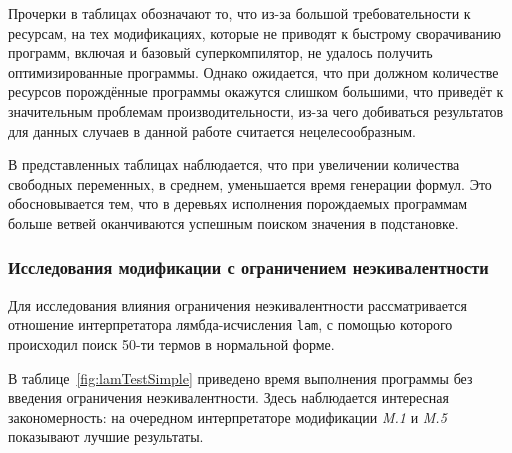 Прочерки в таблицах обозначают то, что из-за большой требовательности к ресурсам,
на тех модификациях, которые не приводят к быстрому сворачиванию программ,
включая и базовый суперкомпилятор, не удалось получить оптимизированные программы.
Однако ожидается,
что при должном количестве ресурсов порождённые программы окажутся слишком большими,
что приведёт к значительным проблемам производительности, из-за чего добиваться
результатов
для данных случаев в данной работе считается нецелесообразным.

В представленных таблицах наблюдается, что при увеличении количества свободных переменных,
в среднем, уменьшается время генерации формул. Это обосновывается тем, что в
деревьях исполнения порождаемых программам больше ветвей оканчиваются успешным
поиском значения в подстановке.



\subsubsection{Исследования модификации с ограничением неэкивалентности}

Для исследования влияния ограничения неэкивалентности рассматривается отношение
интерпретатора лямбда-исчисления \lstinline{lam}, с помощью которого
происходил поиск 50-ти термов в нормальной форме.

В таблице~\ref{fig:lamTestSimple} приведено время выполнения программы
без введения ограничения неэкивалентности. Здесь наблюдается интересная закономерность:
на очередном интерпретаторе модификации {\it M.1} и {\it M.5} показывают лучшие результаты.

